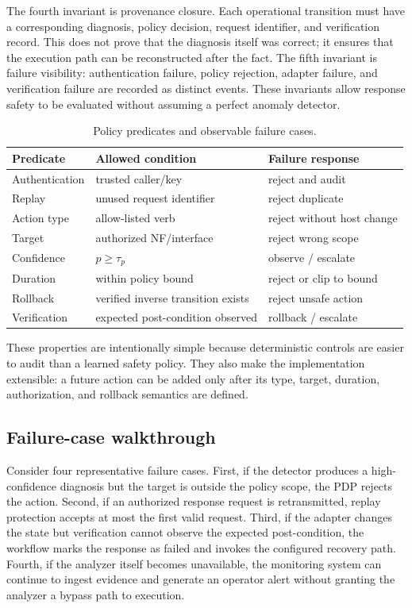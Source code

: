 \documentclass[sigconf,review]{acmart}
\begin{document}
The fourth invariant is provenance closure. Each operational transition must have a corresponding diagnosis, policy decision, request identifier, and verification record. This does not prove that the diagnosis itself was correct; it ensures that the execution path can be reconstructed after the fact. The fifth invariant is failure visibility: authentication failure, policy rejection, adapter failure, and verification failure are recorded as distinct events. These invariants allow response safety to be evaluated without assuming a perfect anomaly detector.

\begin{table}[t]
\caption{Policy predicates and observable failure cases.}
\label{tab:policy}
\centering\scriptsize
\setlength{\tabcolsep}{2.5pt}
\renewcommand{\arraystretch}{1.08}
\begin{tabularx}{\columnwidth}{>{\raggedright\arraybackslash}p{} X X}
\toprule
Predicate & Allowed condition & Failure response \\
\midrule
Authentication & trusted caller/key & reject and audit \\
Replay & unused request identifier & reject duplicate \\
Action type & allow-listed verb & reject without host change \\
Target & authorized NF/interface & reject wrong scope \\
Confidence & $p\ge\tau_p$ & observe / escalate \\
Duration & within policy bound & reject or clip to bound \\
Rollback & verified inverse transition exists & reject unsafe action \\
Verification & expected post-condition observed & rollback / escalate \\
\bottomrule
\end{tabularx}
\end{table}

These properties are intentionally simple because deterministic controls are easier to audit than a learned safety policy. They also make the implementation extensible: a future action can be added only after its type, target, duration, authorization, and rollback semantics are defined.

\subsection{Failure-case walkthrough}
Consider four representative failure cases. First, if the detector produces a high-confidence diagnosis but the target is outside the policy scope, the PDP rejects the action. Second, if an authorized response request is retransmitted, replay protection accepts at most the first valid request. Third, if the adapter changes the state but verification cannot observe the expected post-condition, the workflow marks the response as failed and invokes the configured recovery path. Fourth, if the analyzer itself becomes unavailable, the monitoring system can continue to ingest evidence and generate an operator alert without granting the analyzer a bypass path to execution.
\end{document}
